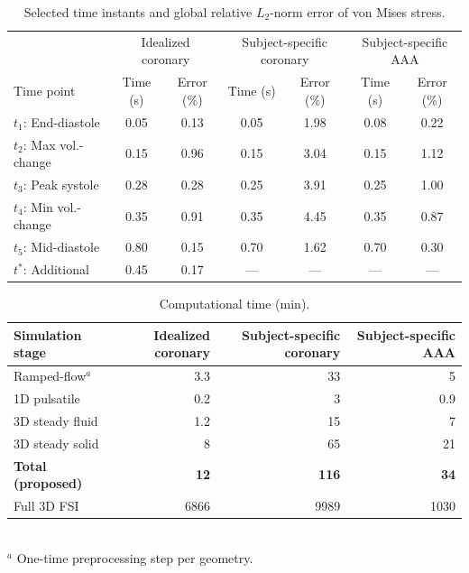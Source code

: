 \documentclass[master,english,final]{kaist-ucs}
\begin{document}
\begin{table}[ht]
\caption[L2 error of von Mises stress]{Selected time instants and global relative $L_2$-norm error of von Mises stress.}
\label{tab:val-l2-error}
\begin{center}
\begin{tabular}{lcccccc}
\hline\hline
& \multicolumn{2}{c}{Idealized coronary} & \multicolumn{2}{c}{Subject-specific coronary} & \multicolumn{2}{c}{Subject-specific AAA} \\
Time point & Time (s) & Error (\%) & Time (s) & Error (\%) & Time (s) & Error (\%) \\
\hline
$t_1$: End-diastole & 0.05 & 0.13 & 0.05 & 1.98 & 0.08 & 0.22 \\
$t_2$: Max vol.-change & 0.15 & 0.96 & 0.15 & 3.04 & 0.15 & 1.12 \\
$t_3$: Peak systole & 0.28 & 0.28 & 0.25 & 3.91 & 0.25 & 1.00 \\
$t_4$: Min vol.-change & 0.35 & 0.91 & 0.35 & 4.45 & 0.35 & 0.87 \\
$t_5$: Mid-diastole & 0.80 & 0.15 & 0.70 & 1.62 & 0.70 & 0.30 \\
$t^{*}$: Additional & 0.45 & 0.17 & --- & --- & --- & --- \\
\hline\hline
\end{tabular}
\end{center}
\end{table}

\begin{table}[ht]
\caption[Computational time]{Computational time (min).}
\label{tab:val-cost}
\begin{center}
\begin{tabular}{lrrr}
\hline\hline
Simulation stage & Idealized coronary & Subject-specific coronary & Subject-specific AAA \\
\hline
Ramped-flow$^{a}$ & 3.3 & 33 & 5 \\
1D pulsatile & 0.2 & 3 & 0.9 \\
3D steady fluid & 1.2 & 15 & 7 \\
3D steady solid & 8 & 65 & 21 \\
\textbf{Total (proposed)} & \textbf{12} & \textbf{116} & \textbf{34} \\
Full 3D FSI & 6866 & 9989 & 1030 \\
\hline\hline
\end{tabular}\\
$^{a}$ One-time preprocessing step per geometry.
\end{center}
\end{table}
\end{document}
